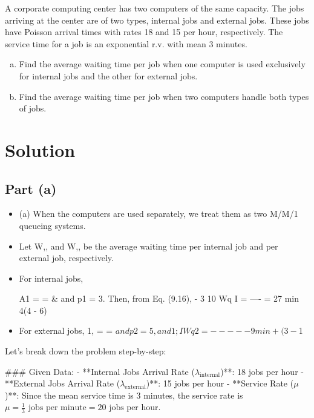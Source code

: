 \documentclass[a4paper12pt]{article}
\begin{document}
\large 





A corporate computing center has two computers of the same capacity. The jobs arriving at the 
center are of two types, internal jobs and external jobs. These jobs have Poisson arrival times 
with rates 18 and 15 per hour, respectively. The service time for a job is an exponential r.v. with 
mean 3 minutes. 
\begin{enumerate}[(a)]
    \item Find the average waiting time per job when one computer is used exclusively for internal 
jobs and the other for external jobs. 
    \item Find the average waiting time per job when two computers handle both types of jobs. 
\end{enumerate}


\section*{Solution}

\subsection*{Part (a)}
\begin{itemize}
    \item (a) When the computers are used separately, we treat them as two M/M/1 queueing systems. 
    
        \item Let W,, and 
W,, be the average waiting time per internal job and per external job, respectively. 

    \item For internal jobs, 

A1 = = & and p1 = 3. Then, from Eq. (9.16), 
- 3 
10 Wq I = ---- = 27 min 4(4 - 6) 
    \item For external jobs, 1, = = $ and p2 = 5, and 
1 
;I Wq2 = ---- - 9 min +(3 - $1 
\end{itemize}

Let's break down the problem step-by-step:

### Given Data:
- **Internal Jobs Arrival Rate (\(\lambda_{\text{internal}}\))**: 18 jobs per hour
- **External Jobs Arrival Rate (\(\lambda_{\text{external}}\))**: 15 jobs per hour
- **Service Rate (\(\mu\))**: Since the mean service time is 3 minutes, the service rate is \(\mu = \frac{1}{3} \text{ jobs per minute} = 20 \text{ jobs per hour}\).
\end{document}
